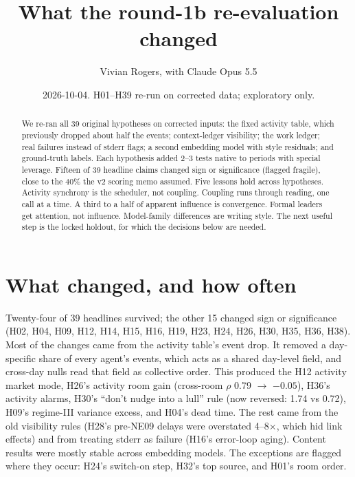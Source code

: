 \documentclass[aps,pre,reprint,10pt,nofootinbib]{revtex4-2}
\begin{document}
\title{What the round-1b re-evaluation changed}
\author{Vivian Rogers, with Claude Opus 5.5}
\date[]{2026-10-04. H01--H39 re-run on corrected data; exploratory only.}
\begin{abstract}
We re-ran all 39 original hypotheses on corrected inputs: the fixed activity table, which previously dropped about half the events; context-ledger visibility; the work ledger; real failures instead of stderr flags; a second embedding model with style residuals; and ground-truth labels. Each hypothesis added 2--3 tests native to periods with special leverage. Fifteen of 39 headline claims changed sign or significance (flagged fragile), close to the 40\% the v2 scoring memo assumed. Five lessons hold across hypotheses. Activity synchrony is the scheduler, not coupling. Coupling runs through reading, one call at a time. A third to a half of apparent influence is convergence. Formal leaders get attention, not influence. Model-family differences are writing style. The next useful step is the locked holdout, for which the decisions below are needed.
\end{abstract}
\maketitle

\section{What changed, and how often}
Twenty-four of 39 headlines survived; the other 15 changed sign or significance (H02, H04, H09, H12, H14, H15, H16, H19, H23, H24, H26, H30, H35, H36, H38). Most of the changes came from the activity table's event drop. It removed a day-specific share of every agent's events, which acts as a shared day-level field, and cross-day nulls read that field as collective order. This produced the H12 activity market mode, H26's activity room gain (cross-room $\rho$ 0.79 $\to$ $-0.05$), H36's activity alarms, H30's ``don't nudge into a lull'' rule (now reversed: 1.74 vs 0.72), H09's regime-III variance excess, and H04's dead time. The rest came from the old visibility rules (H28's pre-NE09 delays were overstated 4--8$\times$, which hid link effects) and from treating stderr as failure (H16's error-loop aging). Content results were mostly stable across embedding models. The exceptions are flagged where they occur: H24's switch-on step, H32's top source, and H01's room order.
\end{document}
